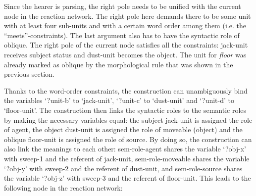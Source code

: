 Since the hearer is parsing, the right pole needs to be unified with the current node in the reaction network. The right pole here demands there to be some unit with at least four sub-units and with a certain word order among them (i.e. the ``meets''-constraints). The last argument also has to have the syntactic role of oblique. The right pole of the current node satisfies all the constraints: jack-unit receives subject status and dust-unit becomes the object. The unit for {\em floor} was already marked as oblique by the morphological rule that was shown in the previous section.

Thanks to the word-order constraints, the construction can unambiguously bind the variables `?unit-b' to `jack-unit', `?unit-c' to `dust-unit' and `?unit-d' to `floor-unit'. The construction then links the syntactic roles to the semantic roles by making the necessary variables equal: the subject jack-unit is assigned the role of agent, the object dust-unit is assigned the role of moveable (object) and the oblique floor-unit is assigned the role of source. By doing so, the construction can also link the meanings to each other: sem-role-agent shares the variable `?obj-x' with sweep-1 and the referent of jack-unit, sem-role-moveable shares the variable `?obj-y' with sweep-2 and the referent of dust-unit, and sem-role-source shares the variable `?obj-z' with sweep-3 and the referent of floor-unit. This leads to the following node in the reaction network:


